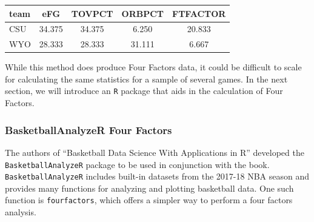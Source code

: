 \documentclass[
  11pt,
]{book}
\newenvironment{Shaded}{\begin{snugshade}}{\end{snugshade}}
\newcommand{\CommentTok}[1]{\textcolor[rgb]{0.56,0.35,0.01}{\textit{#1}}}
\newcommand{\DecValTok}[1]{\textcolor[rgb]{0.00,0.00,0.81}{#1}}
\newcommand{\FunctionTok}[1]{\textcolor[rgb]{0.00,0.00,0.00}{#1}}
\newcommand{\NormalTok}[1]{#1}
\newcommand{\OtherTok}[1]{\textcolor[rgb]{0.56,0.35,0.01}{#1}}
\newcommand{\SpecialCharTok}[1]{\textcolor[rgb]{0.00,0.00,0.00}{#1}}
\newcommand{\StringTok}[1]{\textcolor[rgb]{0.31,0.60,0.02}{#1}}
\theoremstyle{definition}
\theoremstyle{definition}
\theoremstyle{definition}
\theoremstyle{definition}
\theoremstyle{remark}
\begin{document}
\begin{table}[H]
\centering
\begin{tabular}{l|c|c|c|c}
\hline
team & eFG & TOVPCT & ORBPCT & FTFACTOR\\
\hline
CSU & 34.375 & 34.375 & 6.250 & 20.833\\
\hline
WYO & 28.333 & 28.333 & 31.111 & 6.667\\
\hline
\end{tabular}
\end{table}

While this method does produce Four Factors data, it could be difficult to scale for calculating the same statistics for a sample of several games. In the next section, we will introduce an \texttt{R} package that aids in the calculation of Four Factors.

\hypertarget{basketballanalyzer-four-factors}{%
\subsubsection{BasketballAnalyzeR Four Factors}\label{basketballanalyzer-four-factors}}

The authors of ``Basketball Data Science With Applications in R'' developed the \texttt{BasketballAnalyzeR} package to be used in conjunction with the book. \texttt{BasketballAnalyzeR} includes built-in datasets from the 2017-18 NBA season and provides many functions for analyzing and plotting basketball data. One such function is \texttt{fourfactors}, which offers a simpler way to perform a four factors analysis.

\begin{Shaded}
\end{Shaded}
\end{document}
